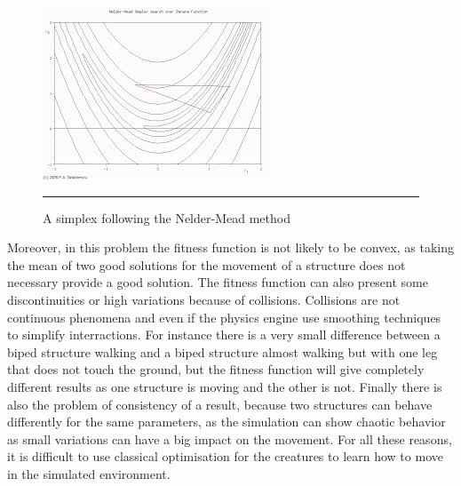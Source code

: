 \begin{figure}[htbp]
    \centering
    \includegraphics[scale=0.7]{Figures/nelder_mead.jpg}
    \rule{35em}{0.5pt}
    \caption[A simplex following the Nelder-Mead method]{A simplex following the Nelder-Mead method}
    \label{fig:nelder_mead}
\end{figure}



Moreover, in this problem the fitness function is not likely to be convex, as taking the mean of two good solutions for the movement of a structure does not necessary provide a good solution. The fitness function can also present some discontinuities or high variations because of collisions. Collisions are not continuous phenomena and even if the physics engine use smoothing techniques to simplify interractions. For instance there is a very small difference between a biped structure walking and a biped structure almost walking but with one leg that does not touch the ground, but the fitness function will give completely different results as one structure is moving and the other is not. Finally there is also the problem of consistency of a result, because two structures can behave differently for the same parameters, as the simulation can show chaotic behavior as small variations can have a big impact on the movement. For all these reasons, it is difficult to use classical optimisation for the creatures to learn how to move in the simulated environment. 





